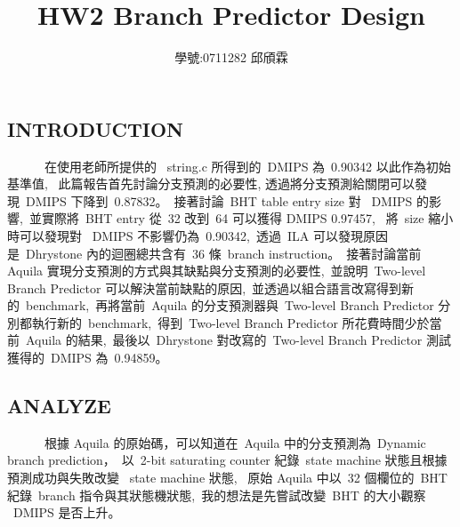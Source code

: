 \documentclass{article}
\title{\textbf{\LARGE {HW2 Branch Predictor Design}}}
\author{學號:0711282 邱頎霖}
\date{}
\begin{document}
\begin{CJK*}{UTF8}{bsmi}
\setlength{\columnsep}{1cm}

\vspace*{-50pt}
    {\let\newpage\relax\maketitle}

\begin{multicols}{2}

\begin{center}
    \section*{INTRODUCTION}
\end{center}

\begin{flushleft}
    \ \ \ \ \ \ 在使用老師所提供的 \ string.c 所得到的\ DMIPS 為\ 0.90342 以此作為初始基準值, \
    此篇報告首先討論分支預測的必要性, 透過將分支預測給關閉可以發現\ DMIPS 下降到\ 0.87832。\
    接著討論\ BHT table entry size 對 \ DMIPS 的影響,\
    並實際將\ BHT entry 從\ 32 改到\ 64 可以獲得 DMIPS 0.97457, \
    將\ size 縮小時可以發現對 \ DMIPS 不影響仍為\ 0.90342,\
    透過\ ILA 可以發現原因是\ Dhrystone 內的迴圈總共含有\ 36 條\ branch instruction。\
    接著討論當前 Aquila 實現分支預測的方式與其缺點與分支預測的必要性,\
    並說明\ Two-level Branch Predictor 可以解決當前缺點的原因,\
    並透過以組合語言改寫得到新的\ benchmark,\
    再將當前\ Aquila 的分支預測器與\ Two-level Branch Predictor 分別都執行新的\ benchmark,\
    得到\ Two-level Branch Predictor 所花費時間少於當前\ Aquila 的結果,\
    最後以\ Dhrystone 對改寫的\ Two-level Branch Predictor 測試獲得的\ DMIPS 為\ 0.94859。
\end{flushleft}

\begin{center}
    \section*{ANALYZE}
\end{center}

\begin{flushleft}
    \ \ \ \ \ \ 根據 Aquila 的原始碼，可以知道在\ Aquila 中的分支預測為\ Dynamic branch prediction，\
    以\ 2-bit saturating counter 紀錄\ state machine 狀態且根據預測成功與失敗改變 \ state machine 狀態, \
    原始 Aquila 中以\ 32 個欄位的\ BHT 紀錄\ branch 指令與其狀態機狀態,\
    我的想法是先嘗試改變\ BHT 的大小觀察 \ DMIPS 是否上升。\newline
    

\end{flushleft}
\end{multicols}
\end{CJK*}
\end{document}
